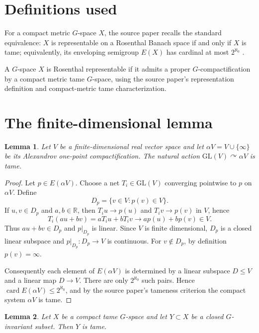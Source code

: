 \documentclass[11pt]{article}
\newtheorem{lemma}{Lemma}
\newcommand{\R}{\mathbb{R}}
\newcommand{\GL}{\mathrm{GL}}
\newcommand{\card}{\operatorname{card}}
\begin{document}
\section*{Definitions used}

For a compact metric \(G\)-space \(X\), the source paper recalls the
standard equivalence: \(X\) is representable on a Rosenthal Banach space
if and only if \(X\) is tame; equivalently, its enveloping semigroup
\(E(X)\) has cardinal at most \(2^{\aleph_0}\)
\cite[Fact 3.11]{Megrelishvili}.

A \(G\)-space \(X\) is Rosenthal representable if it admits a proper
\(G\)-compactification by a compact metric tame \(G\)-space, using the
source paper's representation definition and compact-metric tame
characterization.

\section*{The finite-dimensional lemma}

\begin{lemma}
Let \(V\) be a finite-dimensional real vector space and let
\(\alpha V=V\cup\{\infty\}\) be its Alexandrov one-point
compactification.  The natural action
\(\GL(V)\curvearrowright \alpha V\) is tame.
\end{lemma}

\begin{proof}
Let \(p\in E(\alpha V)\).  Choose a net \(T_i\in\GL(V)\) converging
pointwise to \(p\) on \(\alpha V\).  Define
\[
D_p=\{v\in V:p(v)\in V\}.
\]
If \(u,v\in D_p\) and \(a,b\in\R\), then \(T_i u\to p(u)\) and
\(T_i v\to p(v)\) in \(V\), hence
\[
T_i(au+bv)=aT_i u+bT_i v \longrightarrow ap(u)+bp(v)\in V.
\]
Thus \(au+bv\in D_p\) and \(p|_{D_p}\) is linear.  Since \(V\) is
finite dimensional, \(D_p\) is a closed linear subspace and
\(p|_{D_p}:D_p\to V\) is continuous.  For \(v\notin D_p\), by
definition \(p(v)=\infty\).

Consequently each element of \(E(\alpha V)\) is determined by a linear
subspace \(D\leq V\) and a linear map \(D\to V\).  There are only
\(2^{\aleph_0}\) such pairs.  Hence
\(\card E(\alpha V)\leq 2^{\aleph_0}\), and by the source paper's
tameness criterion the compact system \(\alpha V\) is tame.
\end{proof}

\begin{lemma}
Let \(X\) be a compact tame \(G\)-space and let \(Y\subset X\) be a
closed \(G\)-invariant subset.  Then \(Y\) is tame.
\end{lemma}
\end{document}
